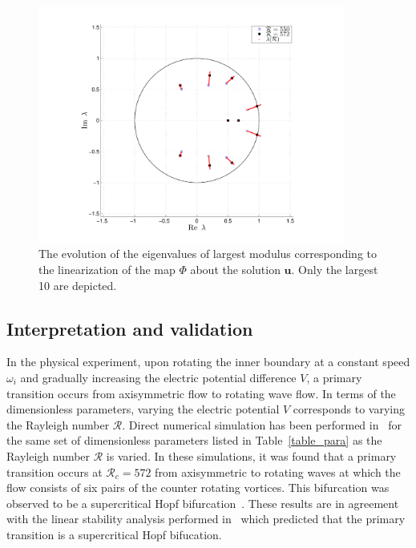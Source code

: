 \begin{figure}[t]
\centerline{\includegraphics[width = 0.9\textwidth]{./figures/Pictures/Eigenvalue_axi_perio}}
\caption{The evolution of the eigenvalues of largest modulus corresponding to the  linearization of the map $\Phi$ about the solution $\mathbf{u}$. Only the largest 10 are depicted.}
\label{eig_axi_rot}
\end{figure}

\subsection{Interpretation and validation}
In the physical experiment, upon rotating the inner boundary at a constant speed $\omega_{i}$ and gradually increasing the electric potential difference $V$, a primary transition occurs from axisymmetric flow to rotating wave flow. In terms of the dimensionless parameters, varying the electric potential $V$ corresponds to varying the Rayleigh number $\mathcal{R}$. Direct numerical simulation has been performed in~\cite{PeiChunTsain} for the same set of dimensionless parameters listed in Table~\ref{table_para} as the Rayleigh number $\mathcal{R}$ is varied. In these simulations, it was found that a primary transition occurs at $\mathcal{R}_c = 572$ from axisymmetric to rotating waves at which the flow consists of six pairs of the counter rotating vortices. This bifurcation was observed to be a supercritical Hopf bifurcation~\cite{DNSSAE,PeiChunTsain}. These results are in agreement with the linear stability analysis performed in~\cite{linearstability} which predicted that the primary transition is a supercritical Hopf bifucation.

